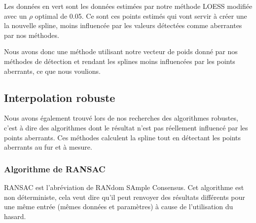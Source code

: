 \documentclass[a4paper,12pt]{article} %
\begin{document}
                       Les données en vert sont les données estimées par notre méthode LOESS modifiée avec un $\rho $ optimal de 0.05.  Ce sont  ces points estimés qui vont servir à créer une la nouvelle spline, moins influencée par les valeurs détectées comme aberrantes par nos méthodes.
                        
                       Nous avons donc une méthode utilisant notre vecteur de poids donné par nos méthodes de détection et rendant les splines moins influencées par les points aberrants, ce que nous voulions.
					    
			\subsection{Interpolation robuste}
        		
        		Nous avons également trouvé lors de nos recherches des algorithmes robustes, c'est à dire des algorithmes dont le résultat n'est pas réellement influencé par les points aberrants. Ces méthodes calculent la spline tout en détectant les points aberrants au fur et à mesure.
        		
			    \subsubsection{Algorithme de RANSAC}
    			   
                    RANSAC est l'abréviation de RANdom SAmple Consensus. Cet algorithme est non déterministe, cela veut dire qu'il peut renvoyer des résultats différents pour une même entrée (mêmes données et paramètres) à cause de l'utilisation du hasard.\\
                    
\end{document}
